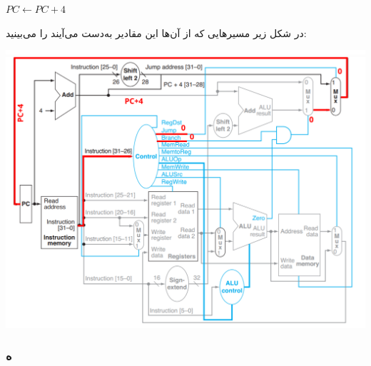 \setLTR

$PC \leftarrow PC + 4$

\setRTL

در شکل زیر مسیرهایی که از آن‌ها این مقادیر به‌دست می‌آیند را می‌بینید:

\setLTR
\qquad\qquad\qquad\includegraphics[scale=0.29]{figs/3.png}

\setRTL

\subsubsection*{ه}

